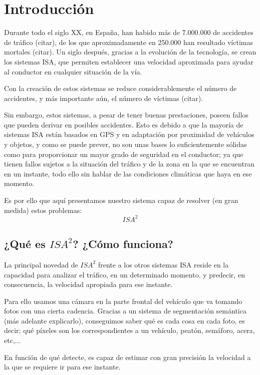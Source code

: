 
\chapter{Introducción} 


Durante todo el siglo XX, en España, han habido más de 7.000.000 de accidentes de tráfico (citar), de los que aproximadamente en 250.000 han resultado víctimas mortales (citar). Un siglo después, gracias a la evolución de la tecnología, se crean los sistemas \ac{ISA}, que permiten establecer una velocidad aproximada para ayudar al conductor en cualquier situación de la vía.


Con la creación de estos sistemas se reduce considerablemente el número de accidentes, y más importante aún, el número de víctimas (citar).


Sin embargo, estos sistemas, a pesar de tener buenas prestaciones, poseen fallos que pueden derivar en posibles accidentes. Esto es debido a que la mayoría de sistemas \ac{ISA} están basados en GPS y en adaptación por proximidad de vehículos y objetos, y como se puede prever, no son unas bases lo suficientemente sólidas como para proporcionar un mayor grado de seguridad en el conductor; ya que tienen fallos sujetos a la situación del tráfico y de la zona en la que se encuentran en un instante, todo ello sin hablar de las condiciones climáticas que haya en ese momento.


Es por ello que aquí presentamos nuestro sistema capaz de resolver (en gran medida) estos problemas: \[ISA^{2}\]


\section{¿Qué es $ISA^{2}$? ¿Cómo funciona?}


La principal novedad de $ISA^{2}$ frente a los otros sistemas \ac{ISA} reside en la capacidad para analizar el tráfico, en un determinado momento, y predecir, en consecuencia, la velocidad apropiada para ese instante.


Para ello usamos una cámara en la parte frontal del vehículo que va tomando fotos con una cierta cadencia. Gracias a un sistema de segmentación semántica (más adelante explicarlo), conseguimos saber qué es cada cosa en cada foto, es decir; qué píxeles son los correspondientes a un vehículo, peatón, semáforo, acera, etc,...


En función de qué detecte, es capaz de estimar con gran precisión la velocidad a la que se requiere ir para ese instante.



